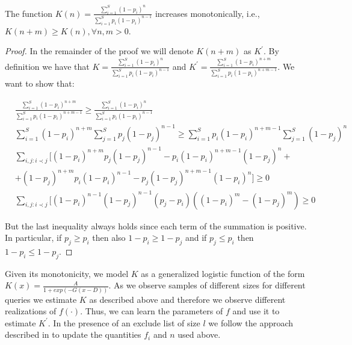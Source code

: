 \begin{lemma}
\label{monotonicity}
The function $K(n) = \frac{\sum_{i=1}^S (1-p_i)^n}{\sum_{i=1}^S p_i(1-p_i)^{n-1}}$ increases monotonically, i.e., $K(n+m) \geq K(n), \forall n,m > 0$.
\end{lemma}
\iftr
\begin{proof}
In the remainder of the proof we will denote $K(n+m)$ as $K^{\prime}$. By definition we have that $K = \frac{\sum_{i=1}^S (1-p_i)^n}{\sum_{i=1}^S p_i(1-p_i)^{n-1}}$ and $K^{\prime} = \frac{\sum_{i=1}^S (1-p_i)^{n+m}}{\sum_{i=1}^S p_i(1-p_i)^{n+m-1}}$. We want to show that:

{\small
\begin{align}
&\frac{\sum_{i=1}^S (1-p_i)^{n+m}}{\sum_{i=1}^S p_i(1-p_i)^{n+m-1}} \geq \frac{\sum_{i=1}^S (1-p_i)^n}{\sum_{i=1}^S p_i(1-p_i)^{n-1}} \nonumber \\
&\sum_{i=1}^S (1-p_i)^{n+m}\sum_{j=1}^S p_j(1-p_j)^{n-1} \geq \sum_{i=1}^S p_i(1-p_i)^{n+m-1}\sum_{j=1}^S (1-p_j)^n\nonumber \\
&\sum_{i,j:i\prec j}[(1-p_i)^{n+m}p_j(1-p_j)^{n-1} - p_i(1-p_i)^{n+m-1}(1-p_j)^n + \nonumber \\
& + (1-p_j)^{n+m}p_i(1-p_i)^{n-1} - p_j(1-p_j)^{n+m-1}(1-p_i)^n] \geq 0 \nonumber \\
&\sum_{i,j:i\prec j}[(1-p_i)^{n-1}(1-p_j)^{n-1}(p_j-p_i)((1-p_i)^{m} - (1-p_j)^{m}) \geq 0
\end{align}}

But the last inequality always holds since each term of the summation is positive. In particular, if $p_j \geq p_i$ then
also $1-p_i \geq 1-p_j$ and if $p_j \leq p_i$ then $1-p_i \leq 1-p_j$.
\end{proof}
\fi
Given its monotonicity, we model $K$ as a generalized logistic function of the form $K(x) = \frac{A}{1+exp(-G(x-D))}$. As we observe samples of different sizes for different queries we estimate $K$ as described above and therefore we observe different realizations of $f(\cdot)$. Thus, we can learn the parameters of $f$ and use it to estimate $K^{\prime}$. In the presence of an exclude list of size $l$ we follow the approach described in  to update the quantities $f_i$ and $n$ used above. 

